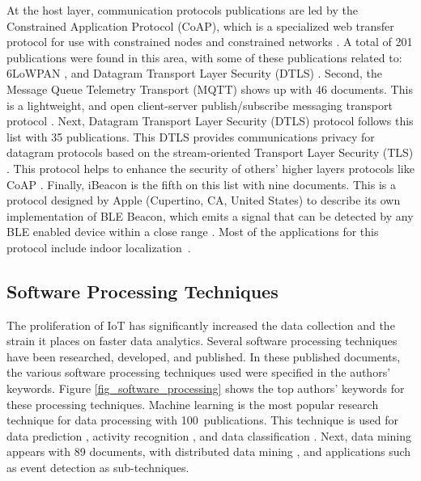 \documentclass[symmetry,article,accept,moreauthors,pdftex10pt,a4paper]{mdpi}
\begin{document}
At the host layer, communication protocols publications are led by the Constrained Application Protocol (CoAP), which is a specialized web transfer protocol for use with constrained nodes and constrained networks \cite{rfc7252}. A total of 201 publications were found in this area, with some of these publications related to: 6LoWPAN \cite{Bimschas2012,Hellaoui201525,Mohiuddin201424}, and  Datagram Transport Layer Security (DTLS) \cite{Bhattacharyya2015682,Lakkundi20147}. Second, the Message Queue Telemetry Transport (MQTT) shows up with 46 documents. This is a lightweight, and open client-server publish/subscribe messaging transport protocol \cite{hillar2017mqtt}. Next, Datagram Transport Layer Security (DTLS) protocol follows this list with 35 publications. This DTLS provides communications privacy for datagram protocols based on the stream-oriented Transport Layer Security (TLS) \cite{rfc6347}. This protocol helps to enhance the security of others' higher layers protocols like CoAP \cite{LessaDosSantos2016809,Raza20133711}. Finally, iBeacon is the fifth on this list with nine documents. This is a protocol designed by Apple (Cupertino, CA, United States) to describe its own implementation of BLE Beacon, which emits a signal that can be detected by any BLE enabled device within a close range \cite{Newman2014222}. Most of the applications for this protocol include indoor localization~\mbox{\cite{Yang2015161,Xiong2016}}.


\subsection{Software Processing Techniques}

The proliferation of IoT has significantly increased the data collection and the strain it places on faster data analytics. Several software processing techniques have been researched, developed, and published. In these published documents, the various software processing techniques used were specified in the authors' keywords. Figure \ref{fig_software_processing} shows the top authors' keywords for these processing techniques. Machine learning is the most popular research technique for data processing with 100~publications. This technique is used for data prediction \cite{Wu20162062,Han2016109}, activity recognition \cite{AlSafadi201673,7808003}, and data classification \cite{Khan201461,Keshan20152661}. Next, data mining appears with 89 documents, with distributed data mining \cite{Kholod2016480}, and applications such as event detection \cite{Bhuiyan2017109,Tseng2015} as sub-techniques.
\end{document}
